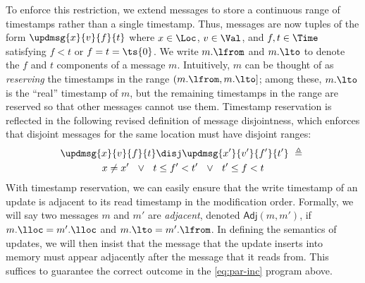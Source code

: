 To enforce this restriction, we extend messages to store a
continuous range of timestamps rather than a single timestamp.  Thus,
messages are now tuples of the form $\updmsg{x}{v}{f}{t}$ where
$x\in\Loc$, $v\in\Val$, and $f,t\in \Time$ satisfying
${f < t}$ or $f=t=\ts{0}$.
We write $m.\lfrom$ and $m.\lto$ to denote the $f$
and $t$ components of a message $m$.  Intuitively, $m$ can be
thought of as \emph{reserving} the timestamps in the range
$(m.\lfrom,m.\lto]$; among these, $m.\lto$ is the ``real'' timestamp
of $m$, but the remaining timestamps in the range are
reserved so that other messages cannot use them.  Timestamp
reservation is reflected in the following revised definition of
message disjointness, which enforces that disjoint messages for the
same location must have disjoint ranges:
\begin{multline*}
\updmsg{x}{v}{f}{t}\disj \updmsg{x'}{v'}{f'}{t'} ~\triangleq ~  \\ x \neq x' ~~\lor~~
t\leq f' < t' ~~\lor~~ t'\leq f < t
\end{multline*}
With timestamp reservation, we can easily ensure that the write timestamp of
an update is adjacent to its read timestamp in the modification order.
Formally, we will say two messages $m$ and $m'$ are \emph{adjacent},
denoted $\mathsf{Adj}(m,m')$, if $m.\lloc=m'.\lloc$ and
$m.\lto = m'.\lfrom$.  In defining the semantics of updates, we will
then insist that the message that the update inserts into memory must
appear adjacently after the message that it reads from.
This suffices
to guarantee the correct outcome in the \ref{eq:par-inc} program
above. 


